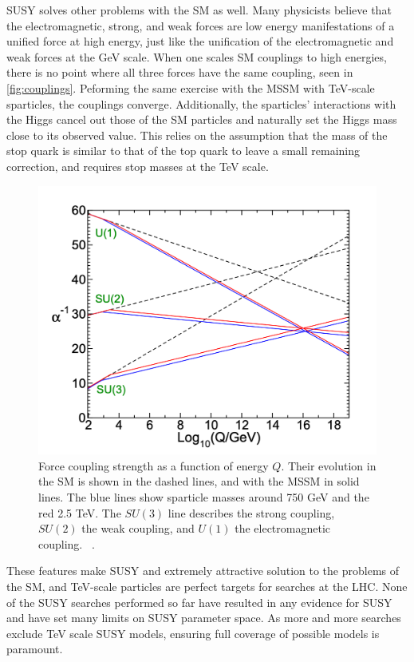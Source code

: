 \ac{SUSY} solves other problems with the \ac{SM} as well. Many physicists believe that the electromagnetic, strong, and weak forces are low energy manifestations of a unified force at high energy, just like the unification of the electromagnetic and weak forces at the GeV scale. When one scales \ac{SM} couplings to high energies, there is no point where all three forces have the same coupling, seen in \autoref{fig:couplings}. Peforming the same exercise with the \ac{MSSM} with TeV-scale sparticles, the couplings converge. Additionally, the sparticles' interactions with the Higgs cancel out those of the \ac{SM} particles and naturally set the Higgs mass close to its observed value. This relies on the assumption that the mass of the stop quark is similar to that of the top quark to leave a small remaining correction, and requires stop masses at the TeV scale.

\begin{figure}[!h]
\centering
\includegraphics[width=.7\textwidth]{figures/theory/couplings.png}
\caption{Force coupling strength as a function of energy $Q$. Their evolution in the \ac{SM} is shown in the dashed lines, and with the \ac{MSSM} in solid lines. The blue lines show sparticle masses around 750 GeV and the red 2.5 TeV. The $SU(3)$ line describes the strong coupling, $SU(2)$ the weak coupling, and $U(1)$ the electromagnetic coupling. ~\cite{susy-primer}.}
\label{fig:couplings}
\end{figure}

These features make \ac{SUSY} and extremely attractive solution to the problems of the \ac{SM}, and TeV-scale particles are perfect targets for searches at the \ac{LHC}. None of the \ac{SUSY} searches performed so far have resulted in any evidence for \ac{SUSY} and have set many limits on \ac{SUSY} parameter space. As more and more searches exclude TeV scale \ac{SUSY} models, ensuring full coverage of possible models is paramount.





